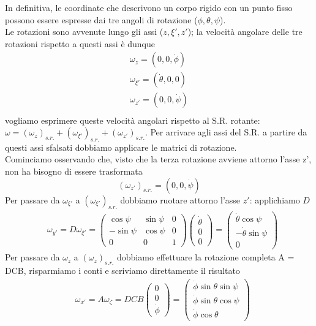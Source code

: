 \documentclass[
10pt, %
a4paper, %
oneside, %
headinclude,footinclude, %
BCOR5mm, %
]{scrartcl}
\begin{document}
In definitiva, le coordinate che descrivono un corpo rigido con un punto fisso possono essere espresse dai tre angoli di rotazione (\(\phi, \theta, \psi\)).\\
Le rotazioni sono avvenute lungo gli assi (\(z, \xi', z'\)); la velocità angolare delle tre rotazioni rispetto a questi assi è dunque
\begin{align*}
	\omega_z = (0, 0, \dot{\phi})\\
	\omega_{\xi'} = ( \dot{\theta},0,  0)\\
	\omega_{z'} = (0, 0, \dot{\psi})\\
\end{align*}
vogliamo esprimere queste velocità angolari rispetto al S.R. rotante: \(\omega = (\omega_{z})_{s.r.}+(\omega_{\xi'})_{s.r.}+ (\omega_{z'})_{s.r.}\). Per arrivare agli assi del S.R. a partire da questi assi sfalsati dobbiamo applicare le matrici di rotazione.\\
Cominciamo osservando che, visto che la terza rotazione avviene attorno l'asse z', non ha bisogno di essere trasformata
\[(\omega_{z'})_{s.r.} = (0, 0, \dot{\psi})\]
Per passare da $\omega_{\xi'}$ a \((\omega_{\xi'})_{s.r.}\) dobbiamo ruotare attorno l'asse $z'$: applichiamo \(D\)
\begin{align*}
	&\omega_{y'} = D\omega_{\xi'}=
	\begin{pmatrix}
		\cos\psi&\sin\psi&0\\
		-\sin\psi&\cos\psi&0\\
		0&0&1
	\end{pmatrix}
\begin{pmatrix}
	\dot{\theta}\\
		0\\
		0
\end{pmatrix} =
\begin{pmatrix}
	\dot{\theta}\cos\psi\\
	-\dot{\theta}\sin\psi\\
	0
\end{pmatrix}
\end{align*}
Per passare da $\omega_{z}$ a  $(\omega_{z})_{s.r.}$ dobbiamo effettuare la rotazione completa A = DCB, risparmiamo i conti e scriviamo direttamente il risultato
\begin{align*}
	&\omega_{x'} = A\omega_{\zeta}=
	DCB	
	\begin{pmatrix}
		0\\
		0\\
		\dot{\phi}
	\end{pmatrix}=
	\begin{pmatrix}
		\dot{\phi}\sin\theta\sin\psi\\
		\dot{\phi}\sin\theta\cos\psi\\
		\dot{\phi}\cos\theta
	\end{pmatrix}
\end{align*}
\end{document}
